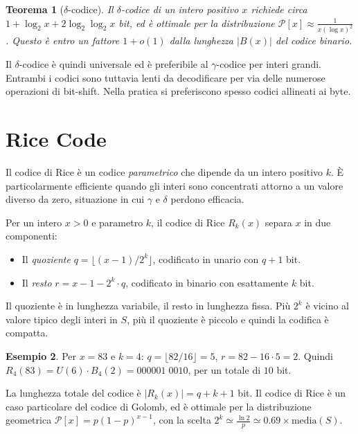 \documentclass[12pt, a4paper, oneside]{book}
\theoremstyle{plain}
\newtheorem{teorema}{Teorema}[chapter]
\theoremstyle{definition}
\newtheorem{esempio}[teorema]{Esempio}
\theoremstyle{remark}
\begin{document}
\begin{teorema}[$\delta$-codice]
\label{thm:delta-code}
Il $\delta$-codice di un intero positivo $x$ richiede circa $1 + \log_2 x + 2\log_2\log_2 x$ bit, ed è ottimale per la distribuzione $\mathcal{P}[x] \approx \frac{1}{x(\log x)^2}$. Questo è entro un fattore $1 + o(1)$ dalla lunghezza $|B(x)|$ del codice binario.
\end{teorema}

Il $\delta$-codice è quindi universale ed è preferibile al $\gamma$-codice per interi grandi. Entrambi i codici sono tuttavia lenti da decodificare per via delle numerose operazioni di bit-shift. Nella pratica si preferiscono spesso codici allineati ai byte.

\section{Rice Code}
\label{sec:rice-code}

Il codice di Rice è un codice \emph{parametrico} che dipende da un intero positivo $k$. È particolarmente efficiente quando gli interi sono concentrati attorno a un valore diverso da zero, situazione in cui $\gamma$ e $\delta$ perdono efficacia.

Per un intero $x > 0$ e parametro $k$, il codice di Rice $R_k(x)$ separa $x$ in due componenti:
\begin{itemize}
  \item Il \emph{quoziente} $q = \lfloor (x-1) / 2^k \rfloor$, codificato in unario con $q + 1$ bit.
  \item Il \emph{resto} $r = x - 1 - 2^k \cdot q$, codificato in binario con esattamente $k$ bit.
\end{itemize}

Il quoziente è in lunghezza variabile, il resto in lunghezza fissa. Più $2^k$ è vicino al valore tipico degli interi in $S$, più il quoziente è piccolo e quindi la codifica è compatta.

\begin{esempio}
Per $x = 83$ e $k = 4$: $q = \lfloor 82 / 16 \rfloor = 5$, $r = 82 - 16 \cdot 5 = 2$. Quindi $R_4(83) = U(6) \cdot B_4(2) = 000001\;0010$, per un totale di $10$ bit.
\end{esempio}

La lunghezza totale del codice è $|R_k(x)| = q + k + 1$ bit. Il codice di Rice è un caso particolare del codice di Golomb, ed è ottimale per la distribuzione geometrica $\mathcal{P}[x] = p(1-p)^{x-1}$, con la scelta $2^k \simeq \frac{\ln 2}{p} \simeq 0.69 \times \text{media}(S)$.
\end{document}
